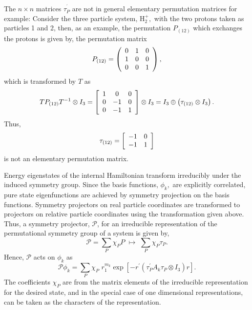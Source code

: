\documentclass[12pt]{article}
\begin{document}
The $n\times n$ matrices $\tau_{P}^{^{\prime}}$ are not in general elementary
permutation matrices for example: Consider the three particle system,
H$_{2}^{+},$ with the two protons taken as particles 1 and 2, then, as an
example, the permutation $P_{(12)}$ which exchanges the protons is given by,
the permutation matrix
\begin{equation}
P_{(12)}=\left(
\begin{array}
[c]{ccc}%
0 & 1 & 0\\
1 & 0 & 0\\
0 & 0 & 1
\end{array}
\right)  ,
\end{equation}
which is transformed by $T$ as
\begin{equation}
TP_{\left(  12\right)  }T^{-1}\otimes I_{3}=\left[
\begin{array}
[c]{ccc}%
1 & 0 & 0\\
0 & -1 & 0\\
0 & -1 & 1
\end{array}
\right]  \otimes I_{3}=I_{3}\oplus\left(  \tau_{\left(  12\right)  }\otimes
I_{3}\right)  .
\end{equation}
Thus,
\begin{equation}
\tau_{\left(  12\right)  }=\left[
\begin{array}
[c]{cc}%
-1 & 0\\
-1 & 1
\end{array}
\right]
\end{equation}
is not an elementary permutation matrix.

Energy eigenstates of the internal Hamiltonian transform irreducibly under the
induced symmetry group. Since the basis functions, $\phi_{k},$ are explicitly
correlated, pure state eigenfunctions are achieved by symmetry projection on
the basis functions. Symmetry projectors on real particle coordinates are
transformed to projectors on relative particle coordinates using the
transformation given above. Thus, a symmetry projector, $\mathcal{P}$, for an
irreducible representation of the permutational symmetry group of a system is
given by,
\begin{equation}
\mathcal{P}=\sum_{P}\chi_{P}P\,\,\mapsto\,\,\sum_{P}\chi_{P}\tau_{P}.
\end{equation}
Hence, $\mathcal{P}$ acts on $\phi_{k}$ as
\begin{equation}
\mathcal{P}\phi_{k}=\sum_{P}\chi_{P}\,\,r_{1}^{m_{k}}\exp\left[  -r^{\prime
}\left(  \tau_{P}^{\prime}A_{k}\tau_{P}\otimes I_{3}\right)  r\right]  .
\end{equation}
The coefficients $\chi_{P}$ are from the matrix elements of the irreducible
representation for the desired state, and in the special case of one
dimensional representations, can be taken as the characters of the representation.
\end{document}
